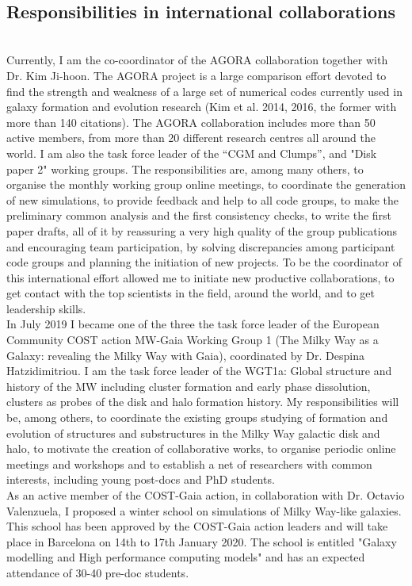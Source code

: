\documentclass[oneside, a4paper, onecolumn, 11pt]{article}
\begin{document}
{\\
\subsection*{Responsibilities in international collaborations}\\

Currently, I am the co-coordinator of the AGORA collaboration together with Dr. Kim Ji-hoon. The AGORA project is a large comparison effort devoted to find the strength and weakness of a large set of numerical codes currently used in galaxy formation and evolution research (Kim et al. 2014, 2016, the former with more than 140 citations). The AGORA collaboration includes more than 50 active members, from more than 20 different research centres all around the world. I am also the task force leader of the “CGM and Clumps”, and "Disk paper 2" working groups. The responsibilities are, among many others, to organise the monthly working group online meetings, to coordinate the generation of new simulations, to provide feedback and help to all code groups, to make the preliminary common analysis and the first consistency checks, to write the first paper drafts, all of it by reassuring a very high quality of the group publications and encouraging team participation, by solving discrepancies among participant code groups and planning the initiation of new projects. To be the coordinator of this international effort allowed me to initiate new productive collaborations, to get contact with the top scientists in the field, around the world, and to get leadership skills.\\

In July 2019 I became one of the three the task force leader of the European Community COST action MW-Gaia Working Group 1 (The Milky Way as a Galaxy: revealing the Milky Way with Gaia), coordinated by Dr. Despina Hatzidimitriou. I am the task force leader of the WGT1a: Global structure and history of the MW including cluster formation and early phase dissolution, clusters as probes of the disk and halo formation history.  My responsibilities will be, among others, to coordinate the existing groups studying of formation and evolution of structures and substructures in the Milky Way galactic disk and halo, to motivate the creation of collaborative works, to organise periodic online meetings and workshops and to establish a net of researchers with common interests, including young post-docs and PhD students.\\
As an active member of the COST-Gaia action, in collaboration with Dr. Octavio Valenzuela, I proposed a winter school on simulations of Milky Way-like galaxies. This school has been approved by the COST-Gaia action leaders and will take place in Barcelona on 14th to 17th January 2020. The school is entitled "Galaxy modelling and High performance computing models" and has an expected attendance of 30-40 pre-doc students.\\

}
\end{document}
